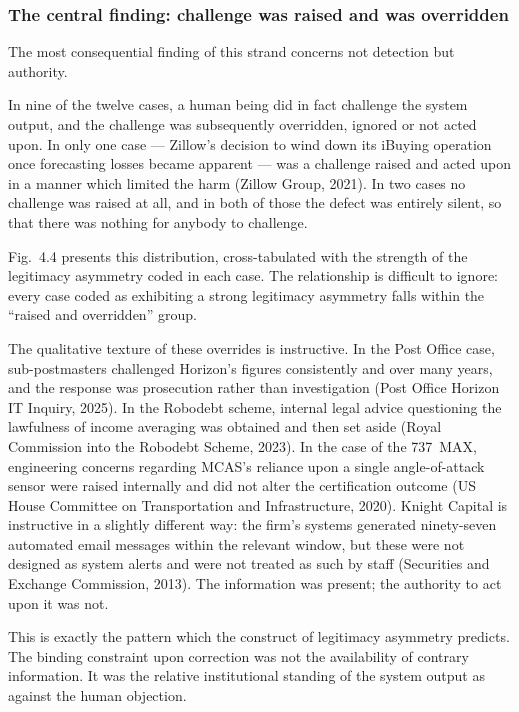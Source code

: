 \documentclass[11pt,a4paper]{article}
\numberwithin{figure}{section}
\numberwithin{table}{section}
\newcommand{\ct}[1]{\textcolor{citeblue}{#1}}          %
\newcommand{\xref}[1]{\textcolor{citeblue}{#1}}         %
\begin{document}
\subsubsection{The central finding: challenge was raised and was overridden}

The most consequential finding of this strand concerns not detection but authority.

In nine of the twelve cases, a human being did in fact challenge the system output, and the
challenge was subsequently overridden, ignored or not acted upon. In only one case --- Zillow's
decision to wind down its iBuying operation once forecasting losses became apparent --- was a
challenge raised and acted upon in a manner which limited the harm \ct{(Zillow Group, 2021)}. In
two cases no challenge was raised at all, and in both of those the defect was entirely silent, so
that there was nothing for anybody to challenge.

\xref{Fig.~4.4} presents this distribution, cross-tabulated with the strength of the legitimacy
asymmetry coded in each case. The relationship is difficult to ignore: every case coded as
exhibiting a strong legitimacy asymmetry falls within the ``raised and overridden'' group.

The qualitative texture of these overrides is instructive. In the Post Office case, sub-postmasters
challenged Horizon's figures consistently and over many years, and the response was prosecution
rather than investigation \ct{(Post Office Horizon IT Inquiry, 2025)}. In the Robodebt scheme,
internal legal advice questioning the lawfulness of income averaging was obtained and then set
aside \ct{(Royal Commission into the Robodebt Scheme, 2023)}. In the case of the 737~MAX, engineering
concerns regarding MCAS's reliance upon a single angle-of-attack sensor were raised internally and
did not alter the certification outcome \ct{(US House Committee on Transportation and
Infrastructure, 2020)}. Knight Capital is instructive in a slightly different way: the firm's
systems generated ninety-seven automated email messages within the relevant window, but these were
not designed as system alerts and were not treated as such by staff \ct{(Securities and Exchange
Commission, 2013)}. The information was present; the authority to act upon it was not.

This is exactly the pattern which the construct of legitimacy asymmetry predicts. The binding
constraint upon correction was not the availability of contrary information. It was the relative
institutional standing of the system output as against the human objection.
\end{document}
